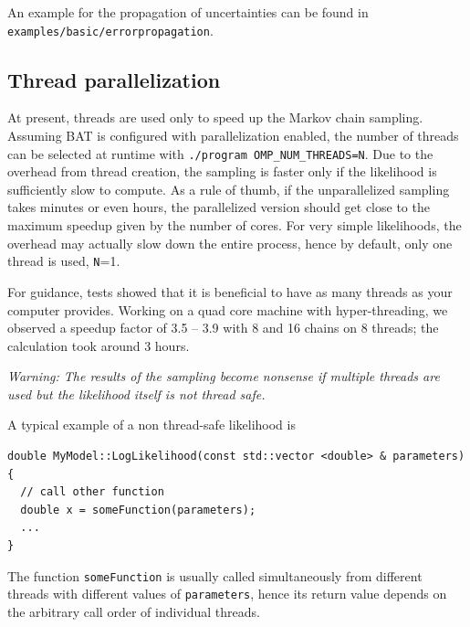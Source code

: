 \documentclass[11pt, a4paper]{article}
\begin{document}
An example for the propagation of uncertainties can be found in
\linebreak \verb|examples/basic/errorpropagation|.


\subsection{Thread parallelization}\label{subsection:thread-par}

At present, threads are used only to speed up the Markov chain sampling.
Assuming BAT is configured with parallelization enabled, the number of threads
can be selected at runtime with \verb|./program OMP_NUM_THREADS=N|.  Due to the
overhead from thread creation, the sampling is faster only if the likelihood is
sufficiently slow to compute. As a rule of thumb, if the unparallelized sampling
takes minutes or even hours, the parallelized version should get close to the
maximum speedup given by the number of cores. For very simple likelihoods, the
overhead may actually slow down the entire process, hence by default, only one
thread is used, \verb|N|=1.

For guidance, tests showed that it is beneficial to have as many threads as your
computer provides. Working on a quad core machine with hyper-threading, we
observed a speedup factor of 3.5 -- 3.9 with 8 and 16 chains on 8 threads; the
calculation took around 3 hours.

\emph{Warning: The results of the sampling become nonsense if multiple threads
are used but the likelihood itself is not thread safe.}

A typical example of a non thread-safe likelihood is 
\begin{verbatim}
double MyModel::LogLikelihood(const std::vector <double> & parameters)
{
  // call other function
  double x = someFunction(parameters);
  ...
}
\end{verbatim}

The function \texttt{someFunction} is usually called simultaneously from
different threads with different values of \texttt{parameters}, hence its return
value depends on the arbitrary call order of individual threads.

\end{document}
